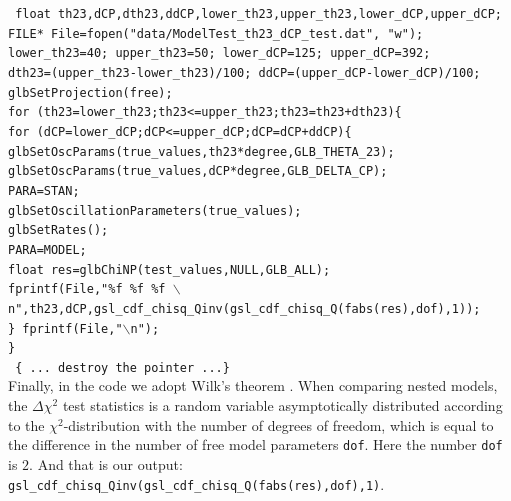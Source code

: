 \documentclass[a4paper,11pt]{article}
\begin{document}
\texttt{
    float th23,dCP,dth23,ddCP,lower\_th23,upper\_th23,lower\_dCP,upper\_dCP;\\
    FILE* File=fopen("data/ModelTest\_th23\_dCP\_test.dat", "w");\\
    lower\_th23=40; upper\_th23=50; lower\_dCP=125; upper\_dCP=392;\\
    dth23=(upper\_th23-lower\_th23)/100; ddCP=(upper\_dCP-lower\_dCP)/100;\\
    glbSetProjection(free);\\
    for (th23=lower\_th23;th23<=upper\_th23;th23=th23+dth23)\{\\
    for (dCP=lower\_dCP;dCP<=upper\_dCP;dCP=dCP+ddCP)\{\\
    glbSetOscParams(true\_values,th23*degree,GLB\_THETA\_23);\\
    glbSetOscParams(true\_values,dCP*degree,GLB\_DELTA\_CP);\\
    PARA=STAN; \\
    glbSetOscillationParameters(true\_values);\\
    glbSetRates();\\
    PARA=MODEL;\\ 
        float res=glbChiNP(test\_values,NULL,GLB\_ALL);\\
            fprintf(File,"\%f \%f \%f $\backslash$n",th23,dCP,gsl\_cdf\_chisq\_Qinv(gsl\_cdf\_chisq\_Q(fabs(res),dof),1));\\
         \} fprintf(File,"$\backslash$n");\\
    \}
}\vspace{0.2cm}\\
\texttt{ \{ ...  destroy the pointer ...\}}\vspace{0.2cm}\\
Finally, in the code we adopt Wilk's theorem \cite{Wilks:1938dza}. When comparing nested models, the $\Delta \chi^2$ test statistics is a random variable asymptotically distributed according to the $\chi^2$-distribution with the number of degrees of freedom, which is equal to the difference in the number of free model parameters \texttt{dof}. Here the number \texttt{dof} is $2$. And that is our output: \texttt{gsl\_cdf\_chisq\_Qinv(gsl\_cdf\_chisq\_Q(fabs(res),dof),1)}.
\end{document}
